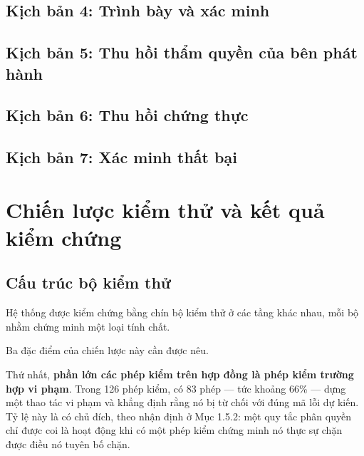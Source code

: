 

\subsection{Kịch bản 4: Trình bày và xác minh}



\subsection{Kịch bản 5: Thu hồi thẩm quyền của bên phát hành}



\subsection{Kịch bản 6: Thu hồi chứng thực}



\subsection{Kịch bản 7: Xác minh thất bại}



\section{Chiến lược kiểm thử và kết quả kiểm chứng}

\subsection{Cấu trúc bộ kiểm thử}

Hệ thống được kiểm chứng bằng chín bộ kiểm thử ở các tầng khác nhau, mỗi bộ nhằm chứng minh một loại tính chất.



Ba đặc điểm của chiến lược này cần được nêu.

Thứ nhất, \textbf{phần lớn các phép kiểm trên hợp đồng là phép kiểm trường hợp vi phạm}. Trong 126 phép kiểm, có 83 phép --- tức khoảng 66\% --- dựng một thao tác vi phạm và khẳng định rằng nó bị từ chối với đúng mã lỗi dự kiến. Tỷ lệ này là có chủ đích, theo nhận định ở Mục 1.5.2: một quy tắc phân quyền chỉ được coi là hoạt động khi có một phép kiểm chứng minh nó thực sự chặn được điều nó tuyên bố chặn.

